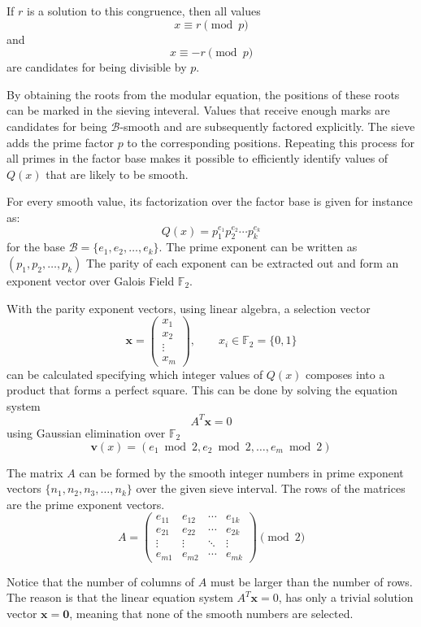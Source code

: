 \documentclass[11pt,a4paper]{article}
\begin{document}
If $r$ is a solution to this congruence, then all values
\[
x\equiv r\pmod p
\]
and
\[
x\equiv -r\pmod p
\]
are candidates for being divisible by $p$.

By obtaining the roots from the modular equation, the positions of these roots can be marked in the sieving inteveral. Values that receive enough marks are candidates for being $\mathcal{B}$-smooth and are subsequently factored explicitly. The sieve adds the prime factor $p$ to the corresponding positions. Repeating this process for all primes in the factor base makes it possible to efficiently identify values of $Q(x)$ that are likely to be smooth.

For every smooth value, its factorization over the factor base is given for instance as:
\[
Q(x)=p_1^{e_1}p_2^{e_2}\cdots p_k^{e_k}
\]
for the base $\mathcal{B}=\{e_1,e_2,\ldots,e_k\}$. The prime exponent can be written as $(p_1, p_2, \ldots, p_k)$ The parity of each exponent can be extracted out and form an exponent vector over Galois Field $\mathbb{F}_2$.

With the parity exponent vectors, using linear algebra, a selection vector
\[
\mathbf{x} =
\begin{pmatrix}
x_1 \\
x_2 \\
\vdots \\
x_m
\end{pmatrix},
\qquad x_i \in \mathbb{F}_2 = \{0,1\}
\]
can be calculated specifying which integer values of $Q(x)$ composes into a product that forms a perfect square. This can be done by solving the equation system 
\[
A^T \mathbf{x} = 0
\]
using Gaussian elimination over $\mathbb{F}_2$
\[
\mathbf v(x)=(e_1\bmod2,e_2\bmod2,\ldots,e_m\bmod2)
\]

The matrix $A$ can be formed by the smooth integer numbers in prime exponent vectors $\{n_1, n_2, n_3, \ldots, n_k\}$ over the given sieve interval. The rows of the matrices are the prime exponent vectors.
\[
A =
\begin{pmatrix}
e_{11} & e_{12} & \cdots & e_{1k} \\
e_{21} & e_{22} & \cdots & e_{2k} \\
\vdots & \vdots & \ddots & \vdots \\
e_{m1} & e_{m2} & \cdots & e_{mk}
\end{pmatrix}
\pmod{2}
\]

Notice that the number of columns of $A$ must be larger than the number of rows. The reason is that the linear equation system $A^T \mathbf{x} = 0$, has only a trivial solution vector $\mathbf{x} = \mathbf{0}$, meaning that none of the smooth numbers are selected.
\end{document}
